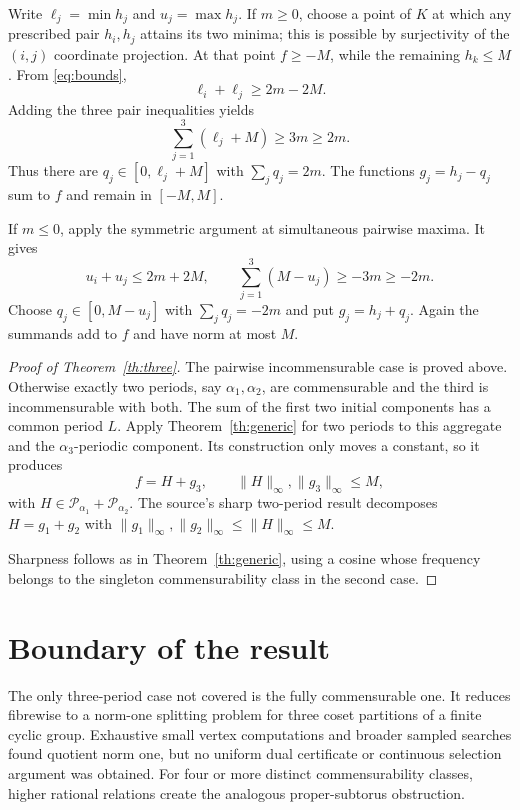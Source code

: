 \documentclass[11pt]{article}
\newcommand{\Pcal}{\mathcal P}
\begin{document}
Write $\ell_j=\min h_j$ and $u_j=\max h_j$.  If $m\ge0$, choose a point of
$K$ at which any prescribed pair $h_i,h_j$ attains its two minima; this is
possible by surjectivity of the $(i,j)$ coordinate projection.  At that point
$f\ge-M$, while the remaining $h_k\le M$.  From \eqref{eq:bounds},
\[
 \ell_i+\ell_j\ge2m-2M.
\]
Adding the three pair inequalities yields
\[
 \sum_{j=1}^3(\ell_j+M)\ge3m\ge2m.
\]
Thus there are $q_j\in[0,\ell_j+M]$ with $\sum_jq_j=2m$.
The functions $g_j=h_j-q_j$ sum to $f$ and remain in $[-M,M]$.

If $m\le0$, apply the symmetric argument at simultaneous pairwise maxima.
It gives
\[
 u_i+u_j\le2m+2M,\qquad
 \sum_{j=1}^3(M-u_j)\ge-3m\ge-2m.
\]
Choose $q_j\in[0,M-u_j]$ with $\sum_jq_j=-2m$ and put
$g_j=h_j+q_j$.  Again the summands add to $f$ and have norm at most $M$.

\begin{proof}[Proof of Theorem~\ref{th:three}]
The pairwise incommensurable case is proved above.  Otherwise exactly two
periods, say $\alpha_1,\alpha_2$, are commensurable and the third is
incommensurable with both.  The sum of the first two initial components has a
common period $L$.  Apply Theorem~\ref{th:generic} for two periods to this
aggregate and the $\alpha_3$-periodic component.  Its construction only moves
a constant, so it produces
\[
 f=H+g_3,\qquad \|H\|_\infty,\|g_3\|_\infty\le M,
\]
with $H\in\Pcal_{\alpha_1}+\Pcal_{\alpha_2}$.  The source's sharp
two-period result decomposes $H=g_1+g_2$ with
$\|g_1\|_\infty,\|g_2\|_\infty\le\|H\|_\infty\le M$.

Sharpness follows as in Theorem~\ref{th:generic}, using a cosine whose
frequency belongs to the singleton commensurability class in the second case.
\end{proof}

\section{Boundary of the result}

The only three-period case not covered is the fully commensurable one.  It
reduces fibrewise to a norm-one splitting problem for three coset partitions
of a finite cyclic group.  Exhaustive small vertex computations and broader
sampled searches found quotient norm one, but no uniform dual certificate or
continuous selection argument was obtained.  For four or more distinct
commensurability classes, higher rational relations create the analogous
proper-subtorus obstruction.
\end{document}
